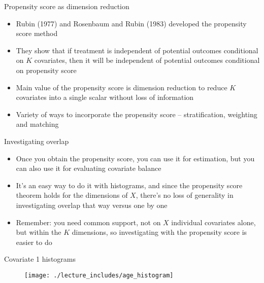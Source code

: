 \documentclass{beamer}
\begin{document}
\begin{frame}{Propensity score as dimension reduction}
	
	\begin{itemize}

	\item Rubin (1977) and Rosenbaum and Rubin (1983) developed the propensity score method
	\item They show that if treatment is independent of potential outcomes conditional on $K$ covariates, then it will be independent of potential outcomes conditional on propensity score 
	\item Main value of the propensity score is dimension reduction  to reduce $K$ covariates into a single scalar without loss of information
	\item Variety of ways to incorporate the propensity score -- stratification, weighting and matching
	\end{itemize}
	
\end{frame}


\begin{frame}{Investigating overlap}

\begin{itemize}

\item Once you obtain the propensity score, you can use it for estimation, but you can also use it for evaluating covariate balance
\item It's an easy way to do it with histograms, and since the propensity score theorem holds for the dimensions of $X$, there's no loss of generality in investigating overlap that way versus one by one 
\item Remember: you need common support, not on $X$ individual covariates alone, but within the $K$ dimensions, so investigating with the propensity score is easier to do

\end{itemize}

\end{frame}



\begin{frame}{Covariate 1  histograms}

  \begin{figure}
    \texttt{[image: ./lecture\_includes/age\_histogram]}
  \end{figure}
  
\end{frame}
\end{document}
